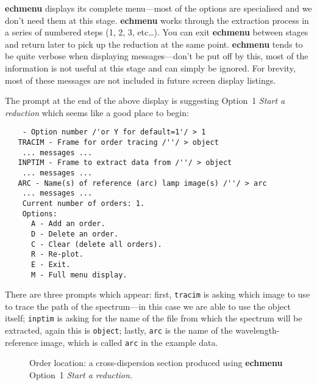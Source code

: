 \documentclass[twoside,11pt]{article}
\newcommand{\xref}[3]{#1}
\newcommand{\scspec}[2]{#1}
\newcommand{\scspec}[2]{#2}
\begin{document}
{\bf echmenu} displays its complete menu\scspec{---}{ - }most of the options
are specialised and we don't need them at this stage.
{\bf echmenu} works through the extraction process in a series of numbered
steps (1, 2, 3, etc\ldots).  You can exit {\bf echmenu} between stages
and return later to pick up the reduction at the same point.
{\bf echmenu} tends to be quite verbose when displaying
messages\scspec{---}{ - }don't be put off by this, most of the information
is not useful at this stage and can simply be ignored.
For brevity, most of these messages are not included in future screen
display listings.

The prompt at the end of the above display is suggesting
\xref{Option~1 {\sl Start a reduction}}{sun152}{option1}
which seems like a good place to begin:

{
\scspec{\small}{ }
\begin{verbatim}
    - Option number /'or Y for default=1'/ > 1
   TRACIM - Frame for order tracing /''/ > object
    ... messages ...
   INPTIM - Frame to extract data from /''/ > object
    ... messages ...
   ARC - Name(s) of reference (arc) lamp image(s) /''/ > arc
    ... messages ...
    Current number of orders: 1.
    Options:
      A - Add an order.
      D - Delete an order.
      C - Clear (delete all orders).
      R - Re-plot.
      E - Exit.
      M - Full menu display.
\end{verbatim}
}

There are three prompts which appear: first,
\xref{{\tt{tracim}}}{sun152}{par_TRACIM} is asking which
image to use to trace the path of the spectrum\scspec{---}{ - }in this case
we are able to use the object itself;
\xref{{\tt{inptim}}}{sun152}{par_INPTIM} is asking for the name of
the file from which the spectrum will be extracted, again this is
\verb+object+; lastly,
\xref{{\tt{arc}}}{sun152}{par_ARC} is the name of the wavelength-reference
image, which is called \verb+arc+ in the example data.

\begin{figure}
\begin{center}
  \scspec{\leavevmode\epsfysize=100mm\epsfbox{sc7_10.eps}}
         {\leavevmode\epsfysize=136mm}

   \parbox{140mm}{
   \caption{Order location: a cross-dispersion section produced using
            {\bf echmenu} Option~1 {\sl Start a reduction.}}
   \label{fi_order_locate}
  }
\end{center}
\end{figure}
\end{document}
